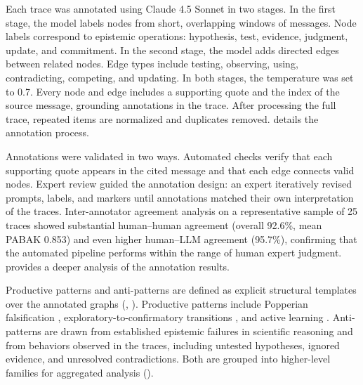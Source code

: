 Each trace was annotated using Claude 4.5 Sonnet in two stages. In the first stage, the model labels nodes from short, overlapping windows of messages. Node labels correspond to epistemic operations: hypothesis, test, evidence, judgment, update, and commitment. In the second stage, the model adds directed edges between related nodes. Edge types include testing, observing, using, contradicting, competing, and updating. In both stages, the temperature was set to 0.7. Every node and edge includes a supporting quote and the index of the source message, grounding annotations in the trace. After processing the full trace, repeated items are normalized and duplicates removed.  details the annotation process.

Annotations were validated in two ways. Automated checks verify that each supporting quote appears in the cited message and that each edge connects valid nodes. Expert review guided the annotation design: an expert iteratively revised prompts, labels, and markers until annotations matched their own interpretation of the traces. Inter-annotator agreement analysis on a representative sample of 25 traces showed substantial human–human agreement (overall 92.6\%, mean PABAK 0.853) and even higher human–LLM agreement (95.7\%), confirming that the automated pipeline performs within the range of human expert judgment.  provides a deeper analysis of the annotation results.


Productive patterns and anti-patterns are defined as explicit structural templates over the annotated graphs (, ). Productive patterns include Popperian falsification \autocite{popper2005logic}, exploratory-to-confirmatory transitions \autocite{tukey1977exploratory}, and active learning \autocite{lindley1956measure, fedorov2013theory}. Anti-patterns are drawn from established epistemic failures in scientific reasoning and from behaviors observed in the traces, including untested hypotheses, ignored evidence, and unresolved contradictions. Both are grouped into higher-level families for aggregated analysis ().



